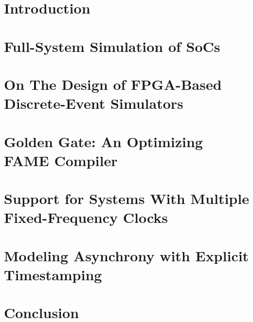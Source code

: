 \documentclass[phd]{ucbthesis}
\begin{document}
\pagestyle{headings}


\chapter{Introduction}



\chapter{Full-System Simulation of SoCs}\label{sec:simulation-background}



\chapter{On The Design of FPGA-Based Discrete-Event Simulators}\label{ch:fpga-des}

\label{sec:fpga-des}

\chapter{Golden Gate: An Optimizing FAME Compiler}\label{sec:golden-gate}



%
%

\chapter{Support for Systems With Multiple Fixed-Frequency Clocks}\label{sec:static-multiclock}



\chapter{Modeling Asynchrony with Explicit Timestamping}\label{sec:dynamic-multiclock}



\chapter{Conclusion}



\printbibliography
\end{document}
